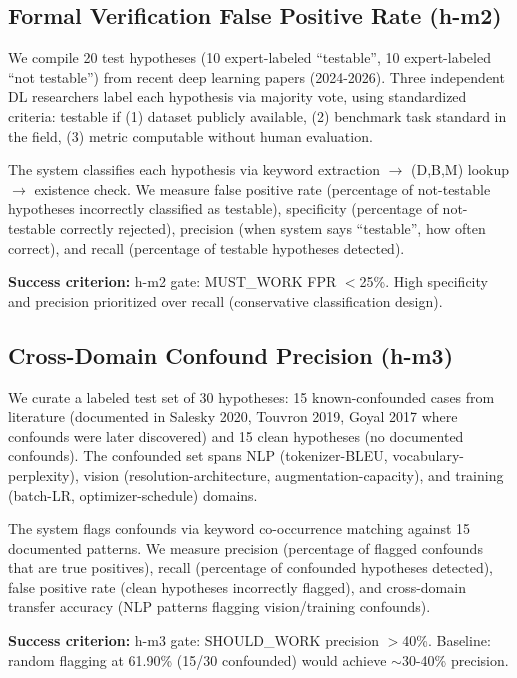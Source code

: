 \subsection{Formal Verification False Positive Rate (h-m2)}

We compile 20 test hypotheses (10 expert-labeled ``testable'', 10 expert-labeled ``not testable'') from recent deep learning papers (2024-2026). Three independent DL researchers label each hypothesis via majority vote, using standardized criteria: testable if (1) dataset publicly available, (2) benchmark task standard in the field, (3) metric computable without human evaluation.

The system classifies each hypothesis via keyword extraction $\rightarrow$ (D,B,M) lookup $\rightarrow$ existence check. We measure false positive rate (percentage of not-testable hypotheses incorrectly classified as testable), specificity (percentage of not-testable correctly rejected), precision (when system says ``testable'', how often correct), and recall (percentage of testable hypotheses detected).

\textbf{Success criterion:} h-m2 gate: MUST\_WORK FPR $<$25\%. High specificity and precision prioritized over recall (conservative classification design).

\subsection{Cross-Domain Confound Precision (h-m3)}

We curate a labeled test set of 30 hypotheses: 15 known-confounded cases from literature (documented in Salesky 2020, Touvron 2019, Goyal 2017 where confounds were later discovered) and 15 clean hypotheses (no documented confounds). The confounded set spans NLP (tokenizer-BLEU, vocabulary-perplexity), vision (resolution-architecture, augmentation-capacity), and training (batch-LR, optimizer-schedule) domains.

The system flags confounds via keyword co-occurrence matching against 15 documented patterns. We measure precision (percentage of flagged confounds that are true positives), recall (percentage of confounded hypotheses detected), false positive rate (clean hypotheses incorrectly flagged), and cross-domain transfer accuracy (NLP patterns flagging vision/training confounds).

\textbf{Success criterion:} h-m3 gate: SHOULD\_WORK precision $>$40\%. Baseline: random flagging at 61.90\% (15/30 confounded) would achieve $\sim$30-40\% precision.

